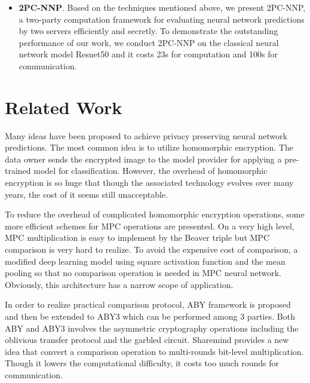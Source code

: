 \documentclass[letterpaper]{article} %
\begin{document}
\begin{itemize}


        \item \textbf{2PC-NNP}.        
        Based on the techniques mentioned above, 
        we present 2PC-NNP, a two-party computation framework 
        for evaluating neural network predictions by two servers efficiently and secretly. 
        To demonstrate the outstanding performance of our work, 
        we conduct 2PC-NNP on the classical neural network model Resnet50 and
        it costs 23s for computation and 100s for communication. 

    \end{itemize}






\section{Related Work}    


    Many ideas have been proposed to achieve privacy preserving neural network predictions. 
    The most common idea is to utilize homomorphic encryption.
    The data owner sends the encrypted image to the model provider for applying a pre-trained model for classification.
    However, the overhead of homomorphic encryption is so huge that though 
    the associated technology evolves over many years\cite{ObliviousNeuralNetwork}, the cost of it seems still unacceptable.
    
    To reduce the overhead of complicated homomorphic encryption operations,
    some more efficient schemes for MPC operations are presented.
    On a very high level, MPC multiplication is easy to implement by the Beaver triple \cite{EfficientMultipartyProtocols} 
    but MPC comparison is very hard to realize.
    To avoid the expensive cost of comparison, 
    a modified deep learning model \cite{CryptoNets} using square activation function and the mean pooling so that
    no comparison operation is needed in MPC neural network.
    Obviously, this architecture has a narrow scope of application.

    In order to realize practical comparison protocol, ABY framework \cite{ABY} is proposed
    and then be extended to ABY3 \cite{ABY3} which can be performed among 3 parties.
    Both ABY and ABY3 involves the asymmetric cryptography operations
    including the oblivious transfer protocol and the garbled circuit.
    Sharemind provides a new idea that convert a comparison operation to 
    multi-rounds bit-level multiplication.
    Though it lowers the computational difficulty, it costs too much rounds for
    communication.
\end{document}

